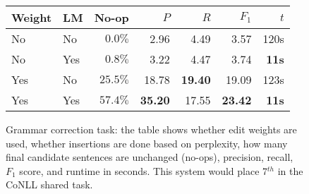 \begin{figure}[t]
\begin{center}
    \begin{tabular}{llrrrrr}
        \hline
        \textbf{Weight} & \textbf{LM} & \textbf{No-op} & $P$ & $R$
        & $F_1$ & $t$ \\
        \hline
        No & No & $0.0\%$ & 2.96 & 4.49 & 3.57 & 120s \\
        No & Yes & $0.8\%$ & 3.22 & 4.47 & 3.74 & \textbf{11s} \\
        Yes & No & $25.5\%$ & 18.78 & \textbf{19.40} & 19.09 & 123s \\
        Yes & Yes & $57.4\%$ & \textbf{35.20} & 17.55 & \textbf{23.42} &
        \textbf{11s}\\
        \hline
    \end{tabular}
    \caption{Grammar correction task: the table shows
        whether edit weights are used, whether insertions are done based on
        perplexity, how many final candidate sentences are unchanged (no-ops),
        precision, recall, $F_1$ score, and runtime in seconds. This system
        would place 7$^{th}$ in the CoNLL shared task.}
    \label{fig-gec}
\end{center}
\vskip-20pt
\end{figure}

